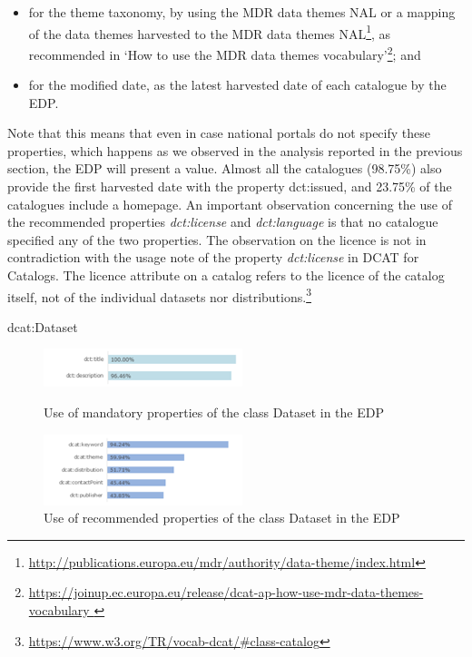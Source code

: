 \documentclass[<options>]{elsarticle}
\begin{document}
\begin{itemize}
\item for the theme taxonomy, by using the MDR data themes NAL or a mapping of the data themes harvested to the MDR data themes NAL\footnote{\href{    http://publications.europa.eu/mdr/authority/data-theme/index.html}{ http://publications.europa.eu/mdr/authority/data-theme/index.html}}, as recommended in ‘How to use the MDR data themes vocabulary’\footnote{\href{     https://joinup.ec.europa.eu/release/dcat-ap-how-use-mdr-data-themes-vocabulary}{  https://joinup.ec.europa.eu/release/dcat-ap-how-use-mdr-data-themes-vocabulary }}; and
\item for the modified date, as the latest harvested date of each catalogue by the EDP.
\end{itemize}

Note that this means that even in case national portals do not specify these properties, which happens as we observed in the analysis reported in the previous section, the EDP will present a value.
Almost all the catalogues (98.75\%) also provide the first harvested date with the property dct:issued, and 23.75\% of the catalogues include a homepage. 
An important observation concerning the use of the recommended properties \textit{dct:license} and \textit{dct:language} is that no catalogue specified any of the two properties. The observation on the licence is not in contradiction with the usage note of the property \textit{dct:license} in DCAT for Catalogs. The licence attribute on a catalog refers to the licence of the catalog itself, not of the individual datasets nor distributions.\footnote{\href{      https://www.w3.org/TR/vocab-dcat/\#class-catalog}{https://www.w3.org/TR/vocab-dcat/\#class-catalog}} 

dcat:Dataset
\begin{figure}[!h]
\includegraphics{replace19.png}
\caption{Use of mandatory properties of the class Dataset in the EDP}
\includegraphics{replace20.png}
\caption{Use of recommended properties of the class Dataset in the EDP}
\end{figure}
\end{document}
